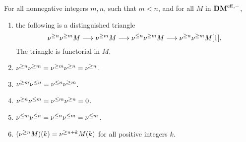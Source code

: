 \begin{prop}\label{prop_sDM_properties}
For all nonnegative integers $m, n$, such that $m < n$, and
for all $M$ in $\DMeff$,

\begin{enumerate}
\item the following is a distinguished triangle
\begin{equation}
\sgDM{n}\sgDM{m} M \to \sgDM{m}M \to \slDM{n}\sgDM{m}M \to 
   \sgDM{n}\sgDM{m} M[1].
\end{equation}
The triangle is functorial in $M$.

\item $\sgDM{n}\sgDM{m} = \sgDM{m}\sgDM{n} = \sgDM{n}$.

\item $\sgDM{m}\slDM{n} = \slDM{n}\sgDM{m}$.

\item $\sgDM{n}\slDM{m} = \slDM{m}\sgDM{n} = 0$.

\item $\slDM{m}\slDM{n} = \slDM{n}\slDM{m} = \slDM{m}$.

\item $\tZ[k]{(\sgDM{n}M)} = \sgDM{n + k}\tZ[k]{M}$ for all 
positive integers $k$.

\end{enumerate}
\end{prop}
